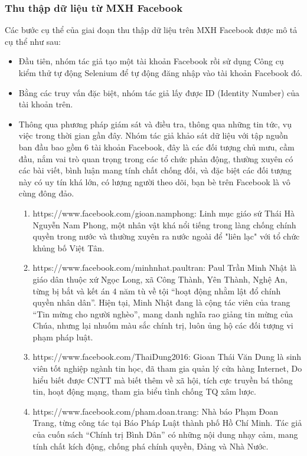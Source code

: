 \subsubsection{Thu thập dữ liệu từ MXH Facebook}
Các bước cụ thể của giai đoạn thu thập dữ liệu trên MXH Facebook được mô tả cụ thể như sau:
\begin {itemize}
\item Đầu tiên, nhóm tác giả tạo một tài khoản Facebook rồi sử dụng Công cụ kiểm thử tự động Selenium để tự động đăng nhập vào tài khoản Facebook đó.

\item Bằng các truy vấn đặc biệt, nhóm tác giả lấy được ID (Identity Number) của tài khoản trên.

\item Thông qua phương pháp giám sát và điều tra, thông qua những tin tức, vụ việc trong thời gian gần đây. Nhóm tác giả khảo sát dữ liệu với tập nguồn ban đầu bao gồm 6 tài khoản Facebook, đây là các đối tượng chủ mưu, cầm đầu, nắm vai trò quan trọng trong các tổ chức phản động, thường xuyên có các bài viết, bình luận mang tính chất chống đối, và đặc biệt các đối tượng này có uy tín khá lớn, có lượng người theo dõi, bạn bè trên Facebook là vô cùng đông đảo.
\begin {enumerate} [+]
\item https://www.facebook.com/gioan.namphong: Linh mục giáo sứ Thái Hà Nguyễn Nam Phong, một nhân vật khá nổi tiếng trong làng chống chính quyền trong nước và thường xuyên ra nước ngoài để "liên lạc" với tổ chức khủng bố Việt Tân.

\item https://www.facebook.com/minhnhat.paultran: Paul Trần Minh Nhật là giáo dân thuộc xứ Ngọc Long, xã Công Thành, Yên Thành, Nghệ An, từng bị bắt và kết án 4 năm tù về tội “hoạt động nhằm lật đổ chính quyền nhân dân”. Hiện tại, Minh Nhật đang là cộng tác viên của trang “Tin mừng cho người nghèo”, mang danh nghĩa rao giảng tin mừng của Chúa, nhưng lại nhuốm màu sắc chính trị, luôn ủng hộ các đối tượng vi phạm pháp luật.

\item https://www.facebook.com/ThaiDung2016: Gioan Thái Văn Dung là sinh viên tốt nghiệp ngành tin học, đã tham gia quản lý cửa hàng Internet, Do hiểu biết được CNTT mà biết thêm về xã hội, tích cực truyền bá thông tin, hoạt động mạng, tham gia biểu tình chống TQ xâm lược.

\item https://www.facebook.com/pham.doan.trang: Nhà báo Phạm Đoan Trang, từng công tác tại Báo Pháp Luật thành phố Hồ Chí Minh. Tác giả của cuốn sách “Chính trị Bình Dân” có những nội dung nhạy cảm, mang tính chất kích động, chống phá chính quyền, Đảng và Nhà Nước.


\end{enumerate}
\end{itemize}
